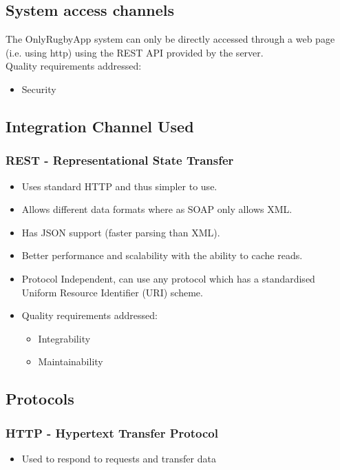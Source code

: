 \documentclass[hidelinks,a4paper,12pt]{article}
\begin{document}
	\subsection{System access channels}
	The OnlyRugbyApp system can only be directly accessed through a web page (i.e. using http) using the REST API provided by the server. \\
	Quality requirements addressed:
	\begin{itemize}
		\item Security
	\end{itemize}

	\subsection{Integration Channel Used}
	\subsubsection {REST - Representational State Transfer}
	\begin{itemize}
		\item Uses standard HTTP and thus simpler to use.
		\item Allows different data formats where as SOAP only allows XML.
		\item Has JSON support (faster parsing than XML).
		\item Better performance and scalability with the ability to cache reads.
		\item Protocol Independent, can use any protocol which has a standardised Uniform Resource Identifier (URI) scheme.
		\item Quality requirements addressed:
			\begin{itemize}
				\item Integrability
				\item Maintainability
			\end{itemize}
	\end{itemize}

	\subsection{Protocols}
	\subsubsection {HTTP - Hypertext Transfer Protocol}
	\begin{itemize}
		\item Used to respond to requests and transfer data
	\end{itemize}
\end{document}
